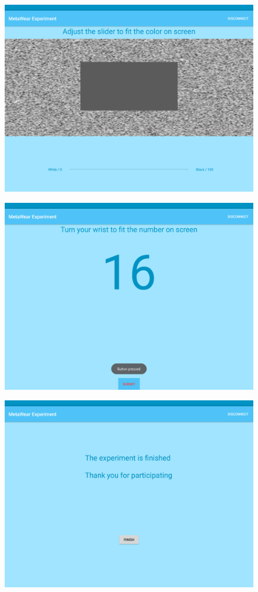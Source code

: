 \begin{figure}[h!]
    \centering
  \includegraphics[width=0.6\linewidth]{figures/tablet_screen10.png}
  \label{app_repeat}
\end{figure}



\begin{figure}[h!]
    \centering
    \includegraphics[width=0.6\linewidth]{figures/tablet_screen16.png}
  \label{app_wrist_int}
\end{figure}

\begin{figure}[h!]
    \centering
  \includegraphics[width=0.6\linewidth]{figures/tablet_screen17.png}
  \label{app_finish}
\end{figure}


